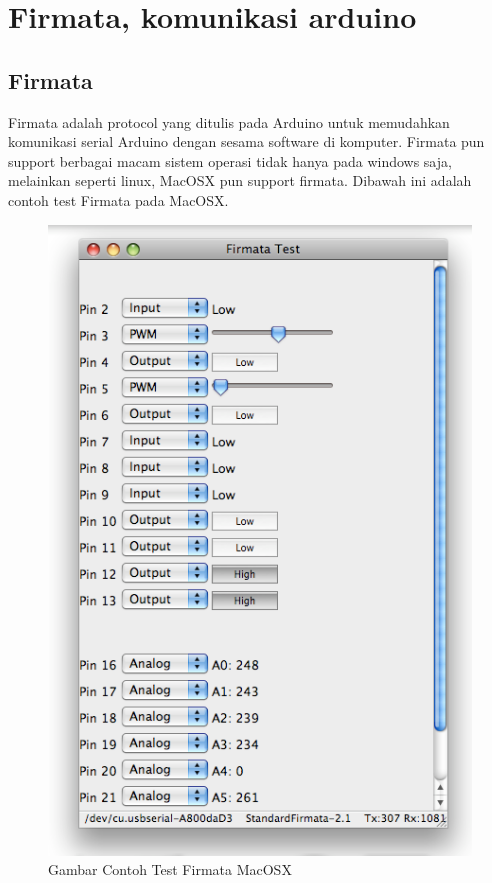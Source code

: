 
\section{Firmata, komunikasi arduino}

	\subsection{Firmata}
	Firmata adalah protocol yang ditulis pada Arduino untuk memudahkan komunikasi serial Arduino dengan sesama software di komputer. Firmata pun support berbagai macam sistem operasi tidak hanya pada windows saja, melainkan seperti linux, MacOSX pun support firmata. Dibawah ini adalah contoh test Firmata pada MacOSX.
	
	\begin{figure} [ht]
		\centerline{\includegraphics[width=1\textwidth]{figures/firmatates.png}}
		\caption{Gambar Contoh Test Firmata MacOSX}
		\label{firmatates}
	\end{figure}
	
